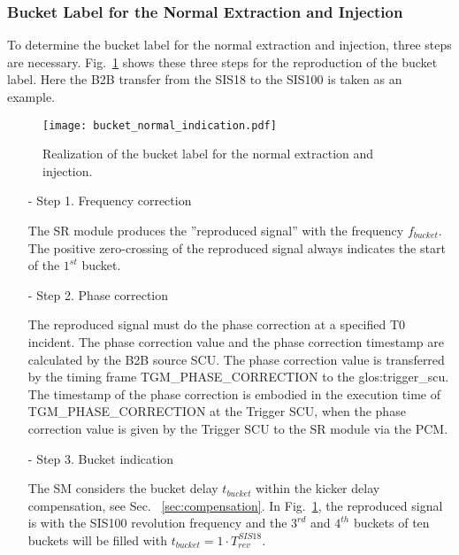 \subsubsection{Bucket Label for the Normal Extraction and Injection}

To determine the bucket label for the normal extraction and injection, three steps are necessary. Fig.~\ref{bucket_label} shows these three steps for the reproduction of the bucket label. Here the B2B transfer from the SIS18 to the SIS100 is taken as an example.
\begin{figure}[!htb]
   \centering   
   \texttt{[image: bucket\_normal\_indication.pdf]}
   \caption{Realization of the bucket label for the normal extraction and injection.}
   \label{bucket_label}
\end{figure}  
\begin{itemize}
\item[-] Step 1. Frequency correction

The \gls{SR} module produces the ''reproduced signal'' with the frequency $f_{\mathit{bucket}}$. The positive zero-crossing of the reproduced signal always indicates the start of the $1^{st}$ bucket.
\item[-] Step 2. Phase correction

The reproduced signal must do the phase correction at a specified T0 incident. The phase correction value and the phase correction timestamp are calculated by the B2B source SCU. The phase correction value is transferred by the timing frame TGM\_PHASE\_CORRECTION to the \gls{glos:trigger_scu}. The timestamp of the phase correction is embodied in the execution time of TGM\_PHASE\_CORRECTION at the Trigger SCU, when the phase correction value is given by the Trigger SCU to the SR module via the PCM.


\item[-] Step 3. Bucket indication

The SM considers the bucket delay $t_{\mathit{bucket}}$ within the kicker delay compensation, see Sec. ~\ref{sec:compensation}. In Fig.~\ref{bucket_label}, the reproduced signal is with the SIS100 revolution frequency and the $3^{rd}$ and $4^{th}$ buckets of ten buckets will be filled with $t_{\mathit{bucket}}=1\cdot T_{\mathit{rev}}^{\mathit{SIS18}}$. 
\end{itemize}

